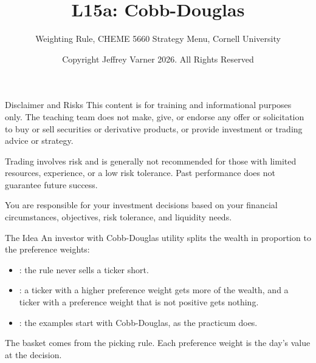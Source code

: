 \documentclass[aspectratio=169,11pt]{beamer}
\title{\texorpdfstring{{\vnheavy L15a}}{L15a}: Cobb-Douglas}
\subtitle{Weighting Rule, CHEME 5660 Strategy Menu, Cornell University}
\author{Copyright Jeffrey Varner 2026. All Rights Reserved}
\begin{document}
\vntitlepage

\begin{frame}{Disclaimer and Risks}
  \vspace{0.6em}
  \textbf{} This content is for training and informational
  purposes only. The teaching team does not make, give, or endorse any offer or
  solicitation to buy or sell securities or derivative products, or provide
  investment or trading advice or strategy.

  \vspace{1.1em}
  \textbf{} Trading involves risk and is generally not recommended for
  those with limited resources, experience, or a low risk tolerance. Past
  performance does not guarantee future success.

  \vspace{1.1em}
  \textbf{} You are responsible for your investment decisions
  based on your financial circumstances, objectives, risk tolerance, and
  liquidity needs.
\end{frame}

\begin{frame}{The Idea}
  \vspace{0.3em}
  An investor with Cobb-Douglas utility splits the wealth in proportion to the preference weights:
  \begin{itemize}\setlength{\itemsep}{0.5em}
    \item {}: the rule never sells a ticker short.
    \item {}: a ticker with a higher preference weight gets more of the wealth, and a ticker with a preference weight that is not positive gets nothing.
    \item {}: the examples start with Cobb-Douglas, as the practicum does.
  \end{itemize}

  \vspace{0.5em}
  The basket comes from the picking rule. Each preference weight is the day's value at the decision.
\end{frame}
\end{document}
